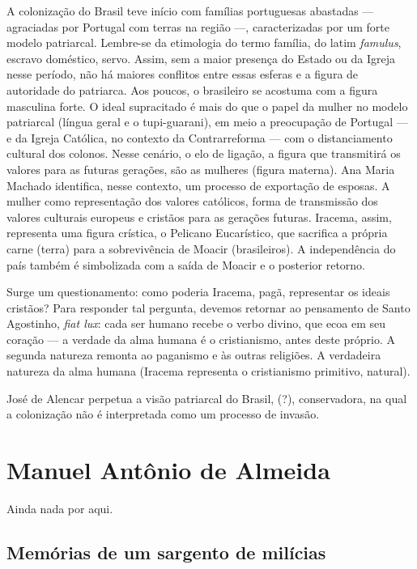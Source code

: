 A colonização do Brasil teve início com famílias portuguesas abastadas — agraciadas por Portugal com terras na região —, caracterizadas por um forte modelo patriarcal. Lembre-se da etimologia do termo família, do latim \textit{famulus}, escravo doméstico, servo. Assim, sem a maior presença do Estado ou da Igreja nesse período, não há maiores conflitos entre essas esferas e a figura de autoridade do patriarca. Aos poucos, o brasileiro se acostuma com a figura masculina forte. O ideal supracitado é mais do que o papel da mulher no modelo patriarcal (língua geral e o tupi-guarani), em meio a preocupação de Portugal — e da Igreja Católica, no contexto da Contrarreforma — com o distanciamento cultural dos colonos. Nesse cenário, o elo de ligação, a figura que transmitirá os valores para as futuras gerações, são as mulheres (figura materna). Ana Maria Machado identifica, nesse contexto, um processo de exportação de esposas. A mulher como representação dos valores católicos, forma de transmissão dos valores culturais europeus e cristãos para as gerações futuras. Iracema, assim, representa uma figura crística, o Pelicano Eucarístico, que sacrifica a própria carne (terra) para a sobrevivência de Moacir (brasileiros). A independência do país também é simbolizada com a saída de Moacir e o posterior retorno.

Surge um questionamento: como poderia Iracema, pagã, representar os ideais cristãos? Para responder tal pergunta, devemos retornar ao pensamento de Santo Agostinho, \textit{fiat lux}: cada ser humano recebe o verbo divino, que ecoa em seu coração — a verdade da alma humana é o cristianismo, antes deste próprio. A segunda natureza remonta ao paganismo e às outras religiões. A verdadeira natureza da alma humana (Iracema representa o cristianismo primitivo, natural).

José de Alencar perpetua a visão patriarcal do Brasil, (?), conservadora, na qual a colonização não é interpretada como um processo de invasão.

\section{Manuel Antônio de Almeida}

Ainda nada por aqui.

\subsection{Memórias de um sargento de milícias}

